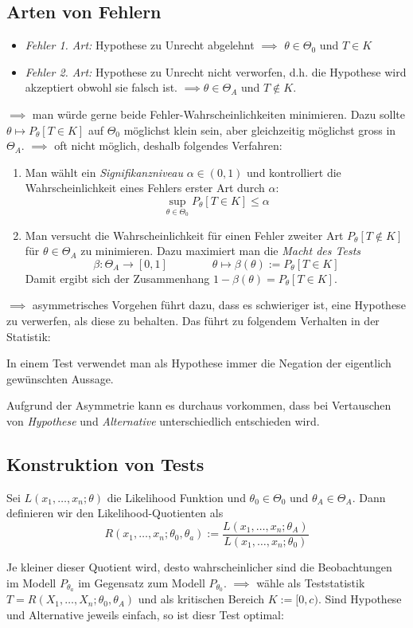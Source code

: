 \subsection*{Arten von Fehlern}
\begin{itemize}
\item \textit{Fehler 1. Art:} Hypothese zu Unrecht abgelehnt $\implies$ $\theta \in \Theta_0$ und $T\in K$
\item \textit{Fehler 2. Art:} Hypothese zu Unrecht nicht verworfen, d.h. die Hypothese wird akzeptiert obwohl sie falsch ist. $\implies \theta \in \Theta_A$ und $T\notin K$.
\end{itemize}
$\implies$ man würde gerne beide Fehler-Wahrscheinlichkeiten minimieren. Dazu sollte $\theta \mapsto P_\theta[T \in K]$ auf $\Theta_0$ möglichst klein sein, aber gleichzeitig möglichst gross in $\Theta_A$. $\implies$ oft nicht möglich, deshalb folgendes Verfahren:
\begin{enumerate}
\item Man wählt ein \textit{Signifikanzniveau} $\alpha \in (0,1)$ und kontrolliert die Wahrscheinlichkeit eines Fehlers erster Art durch $\alpha$:
$$ \sup_{\theta \in \Theta_0} P_\theta [T \in K] \leq \alpha $$
\item Man versucht die Wahrscheinlichkeit für einen Fehler zweiter Art $P_\theta[T \notin K]$ für $\theta \in \Theta_A$ zu minimieren. Dazu maximiert man die \textit{Macht des Tests} $$\beta:\Theta_A \to [0,1] \quad \quad \quad \quad \theta \mapsto \beta(\theta) := P_\theta[T \in K]$$
Damit ergibt sich der Zusammenhang $1-\beta(\theta) = P_\theta[T \in K]$.
\end{enumerate}

$\implies$ asymmetrisches Vorgehen führt dazu, dass es schwieriger ist, eine Hypothese zu verwerfen, als diese zu behalten. Das führt zu folgendem Verhalten in der Statistik:
\begin{mdframed}[backgroundcolor=red!20]
In einem Test verwendet man als Hypothese immer die Negation der eigentlich gewünschten Aussage.
\end{mdframed}
Aufgrund der Asymmetrie kann es durchaus vorkommen, dass bei Vertauschen von \textit{Hypothese} und \textit{Alternative} unterschiedlich entschieden wird.

\subsection{Konstruktion von Tests}
\begin{definition}
Sei $L(x_1,\dots,x_n;\theta)$ die Likelihood Funktion und $\theta_0 \in \Theta_0$ und $\theta_A \in \Theta_A$. Dann definieren wir den Likelihood-Quotienten als
$$ R(x_1,\dots,x_n; \theta_0, \theta_a ) := \frac{L(x_1,\dots,x_n; \theta_A)}{L(x_1,\dots,x_n;\theta_0)}$$
\end{definition}
Je kleiner dieser Quotient wird, desto wahrscheinlicher sind die Beobachtungen im Modell $P_{\theta_a}$ im Gegensatz zum Modell $P_{\theta_0}$. $\implies$ wähle als Teststatistik $T= R(X_1,\dots, X_n; \theta_0, \theta_A)$ und als kritischen Bereich $K:=[0,c)$. Sind Hypothese und Alternative jeweils einfach, so ist diesr Test optimal:

